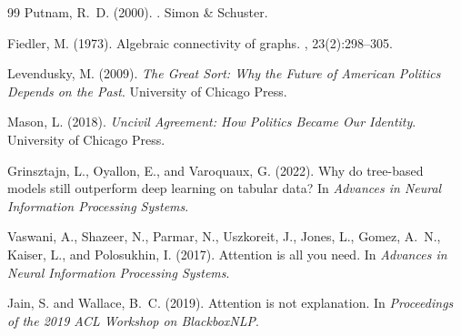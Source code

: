 \documentclass[11pt]{article}
\begin{document}
\begin{thebibliography}{99}
Putnam, R.~D. (2000).
.
\newblock Simon \& Schuster.

Fiedler, M. (1973).
\newblock Algebraic connectivity of graphs.
, 23(2):298--305.

Levendusky, M. (2009).
\newblock \emph{The Great Sort: Why the Future of American Politics Depends on the Past}.
\newblock University of Chicago Press.

Mason, L. (2018).
\newblock \emph{Uncivil Agreement: How Politics Became Our Identity}.
\newblock University of Chicago Press.

Grinsztajn, L., Oyallon, E., and Varoquaux, G. (2022).
\newblock Why do tree-based models still outperform deep learning on tabular data?
\newblock In \emph{Advances in Neural Information Processing Systems}.

Vaswani, A., Shazeer, N., Parmar, N., Uszkoreit, J., Jones, L., Gomez, A.~N., Kaiser, L., and Polosukhin, I. (2017).
\newblock Attention is all you need.
\newblock In \emph{Advances in Neural Information Processing Systems}.

Jain, S. and Wallace, B.~C. (2019).
\newblock Attention is not explanation.
\newblock In \emph{Proceedings of the 2019 ACL Workshop on BlackboxNLP}.

\end{thebibliography}
\end{document}
